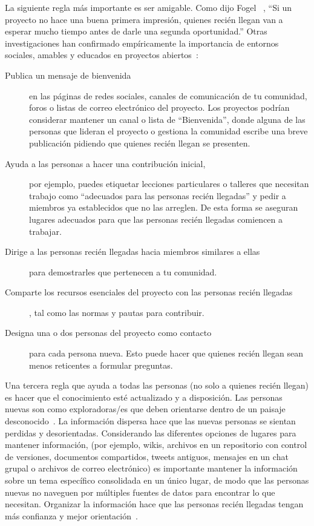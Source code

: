 La siguiente regla más importante es ser amigable.
Como dijo Fogel ~\cite{Foge2005},
``Si un proyecto no hace una buena primera impresión,
quienes recién llegan van a esperar mucho tiempo antes de darle una segunda oportunidad.''
Otras investigaciones han confirmado empíricamente la importancia de entornos sociales, amables y educados
en proyectos abiertos~\cite{Sing2012,Stei2013,Stei2018}:

\begin{description}

\item[Publica un mensaje de bienvenida]
  en las páginas de redes sociales, canales de comunicación de tu comunidad, foros o listas de correo electrónico del proyecto.
  Los proyectos podrían considerar mantener un canal o lista de ``Bienvenida'',
  donde alguna de las personas que lideran el proyecto o gestiona la comunidad escribe una breve publicación pidiendo que quienes recién llegan se presenten.

\item[Ayuda a las personas a hacer una contribución inicial,]
por ejemplo, puedes etiquetar lecciones particulares o talleres que necesitan trabajo como ``adecuados para las personas recién llegadas''
  y pedir a miembros ya establecidos que no las arreglen. De esta forma se aseguran
  lugares adecuados para que las personas recién llegadas comiencen a trabajar.

\item[Dirige a las personas recién llegadas hacia miembros similares a ellas]
  para demostrarles que pertenecen a tu comunidad.

\item[Comparte los recursos esenciales del proyecto con las personas recién llegadas],
  tal como las normas y pautas para contribuir.

\item[Designa una o dos personas del proyecto como contacto]
  para cada persona nueva.
  Esto puede hacer que quienes recién llegan sean menos reticentes a formular preguntas.

\end{description}

Una tercera regla que ayuda a todas las personas (no solo a quienes recién llegan)
es hacer que el conocimiento esté actualizado y a disposición.
Las personas nuevas son como exploradoras/es que deben orientarse dentro de un paisaje desconocido~\cite{Dage2010}.
La información dispersa hace que las nuevas personas se sientan perdidas y desorientadas.
Considerando las diferentes opciones de lugares para mantener información, 
(por ejemplo, wikis, archivos en un repositorio con control de versiones, documentos compartidos, tweets antiguos, mensajes en un chat grupal o archivos de correo electrónico)
es importante mantener la información sobre un tema específico consolidada en un único lugar,
de modo que las personas nuevas no naveguen por múltiples fuentes de datos para encontrar lo que necesitan.
Organizar la información hace que las personas recién llegadas tengan más confianza y mejor orientación~\cite{Stei2016}.

